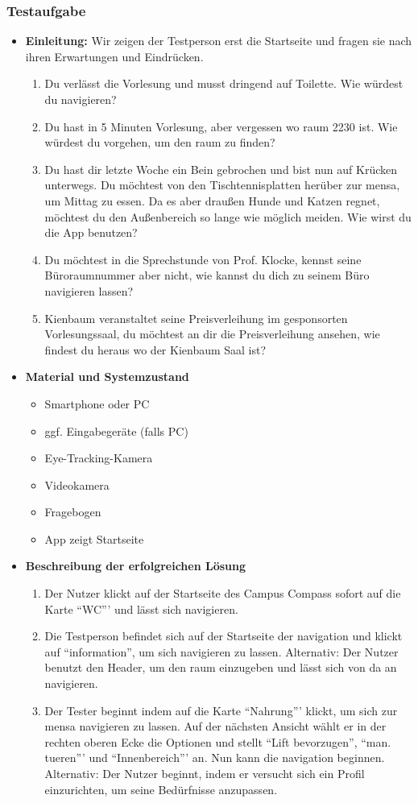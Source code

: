 \subsubsection*{Testaufgabe}
\begin{itemize}
\item \textbf{Einleitung:} Wir zeigen der Testperson erst die Startseite und fragen sie nach ihren Erwartungen und Eindrücken.
\begin{enumerate}
\item Du verlässt die Vorlesung und musst dringend auf Toilette. Wie würdest du navigieren?
\item Du hast in 5 Minuten Vorlesung, aber vergessen wo \gls{raum} 2230 ist. Wie würdest du vorgehen, um den \gls{raum} zu finden?
\item Du hast dir letzte Woche ein Bein gebrochen und bist nun auf Krücken unterwegs. Du möchtest von den Tischtennisplatten herüber zur \gls{mensa}, um Mittag zu essen. Da es aber draußen Hunde und Katzen regnet, möchtest du den Außenbereich so lange wie möglich meiden. Wie wirst du die App benutzen?
\item Du möchtest in die Sprechstunde von Prof. Klocke, kennst seine Büroraumnummer aber nicht, wie kannst du dich zu seinem Büro navigieren lassen?
\item Kienbaum veranstaltet seine Preisverleihung im gesponsorten Vorlesungssaal, du möchtest an dir die Preisverleihung ansehen, wie findest du heraus wo der Kienbaum Saal ist?
\end{enumerate}
\item \textbf{Material und Systemzustand}
\begin{itemize}
\item Smartphone oder PC
\item ggf. Eingabegeräte (falls PC)
\item Eye-Tracking-Kamera
\item Videokamera
\item Fragebogen
\item App zeigt Startseite
\end{itemize}
\item \textbf{Beschreibung der erfolgreichen Lösung}
\begin{enumerate}
\item Der Nutzer klickt auf der Startseite des Campus Compass sofort auf die Karte "`WC"'' und lässt sich navigieren.
\item Die Testperson befindet sich auf der Startseite der \gls{navigation} und klickt auf "`\gls{information}"', um sich navigieren zu lassen.
Alternativ: Der Nutzer benutzt den Header, um den \gls{raum} einzugeben und lässt sich von da an navigieren.
\item Der Tester beginnt indem auf die Karte "`Nahrung"'' klickt, um sich zur \gls{mensa} navigieren zu lassen. Auf der nächsten Ansicht wählt er in der rechten oberen Ecke die Optionen und stellt "`Lift bevorzugen"', "`man. \gls{tuer}en"'' und "`Innenbereich"'' an. Nun kann die \gls{navigation} beginnen.
Alternativ: Der Nutzer beginnt, indem er versucht sich ein Profil einzurichten, um seine Bedürfnisse anzupassen.
\end{enumerate}
\end{itemize}
